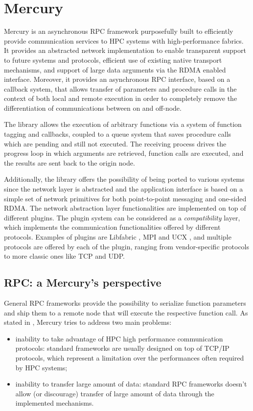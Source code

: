 \section{Mercury}
\label{sec:mercury}
Mercury \cite{mochi-core, mercury} is an asynchronous RPC framework purposefully built to efficiently provide communication services to HPC systems with high-performance fabrics. It provides an abstracted network implementation to enable transparent support to future systems and protocols, efficient use of existing native transport mechanisms, and support of large data arguments via the RDMA enabled interface. Moreover, it provides an asynchronous RPC interface, based on a callback system, that allows transfer of parameters and procedure calls in the context of both local and remote execution in order to completely remove the differentiation of communications between on and off-node.\newline

The library allows the execution of arbitrary functions via a system of function tagging and callbacks, coupled to a queue system that saves procedure calls which are pending and still not executed. The receiving process drives the progress loop in which arguments are retrieved, function calls are executed, and the results are sent back to the origin node.\newline

Additionally, the library offers the possibility of being ported to various systems since the network layer is abstracted and the application interface is based on a simple set of network primitives for both point-to-point messaging and one-sided RDMA. The network abstraction layer functionalities are implemented on top of different plugins. The plugin system can be considered as a \textit{compatibility} layer, which implements the communication functionalities offered by different protocols. Examples of plugins are Libfabric \cite{libfabric, ofi_plugin}, MPI \cite{mpi_plugin} and UCX \cite{openucx}, and multiple protocols are offered by each of the plugin, ranging from vendor-specific protocols to more classic ones like TCP and UDP.\newline

\subsection{RPC: a Mercury's perspective}
General RPC frameworks provide the possibility to serialize function parameters and ship them to a remote node that will execute the respective function call. As stated in \cite{mercury}, Mercury tries to address two main problems:
\begin{itemize}
    \item inability to take advantage of HPC high performance communication protocols: standard frameworks are usually designed on top of TCP/IP protocols, which represent a limitation over the performances often required by HPC systems;
    \item inability to transfer large amount of data: standard RPC frameworks doesn't allow (or discourage) transfer of large amount of data through the implemented mechanisms.
\end{itemize}

